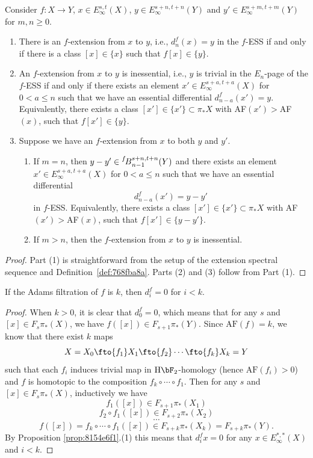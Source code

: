 \documentclass{amsart}
\numberwithin{equation}{section}
\newcommand{\AF}{\mathrm{AF}}
\newcommand{\BESS}[1]{\prescript{#1\!}{}{B}}
\newcommand{\HF}{\mathrm{H}\bF_2}
\begin{document}
\begin{proposition}\label{prop:8154e6f1}
Consider $f: X\to Y$, $x\in E_\infty^{s,t}(X)$, $y\in E_\infty^{s+n,t+n}(Y)$ and $y'\in E_\infty^{s+m,t+m}(Y)$ for $m,n\ge 0$.
\begin{enumerate}
    \item There is an $f$-extension from $x$ to $y$, i.e., $d_n^{f}(x)=y$ in the $f$-ESS if and only if there is a class $[x]\in \{x\}$ such that $f[x]\in \{y\}$.
    \item An $f$-extension from $x$ to $y$ is inessential, i.e., $y$ is trivial in the $E_n$-page of the $f$-ESS if and only if there exists an element $x'\in E_\infty^{s+a,t+a}(X)$ for $0<a\le n$ such that we have an essential differential $d_{n-a}^{f}(x')=y$. Equivalently, there exists a class $[x'] \in \{x'\} \subset \pi_*X$ with AF$(x')>$AF$(x)$, such that $f[x'] \in \{y\}$.
    
    \item Suppose we have an $f$-extension from $x$ to both $y$ and $y'$.
    \begin{enumerate}
        \item If $m=n$, then $y-y'\in \BESS{f}^{s+n,t+n}_{n-1}(Y)$ and there exists an element $x'\in E_\infty^{s+a,t+a}(X)$ for $0<a\le n$ such that we have an essential differential 
        $$d_{n-a}^{f}(x') = y-y'$$
        in $f$-ESS. Equivalently, there exists a class $[x'] \in \{x'\} \subset \pi_*X$ with AF$(x')>$AF$(x)$, such that $f[x'] \in \{y-y'\}$. 
        \item If $m>n$, then the $f$-extension from $x$ to $y$ is inessential.
     \end{enumerate}
\end{enumerate}
\end{proposition}

\begin{proof}
    Part (1) is straightforward from the setup of the extension spectral sequence and Definition~\ref{def:768fba8a}. Parts (2) and (3) follow from Part (1).
\end{proof}

\begin{corollary}
    If the Adams filtration of $f$ is $k$, then
    $d^f_i=0$ for $i<k$.
\end{corollary}

\begin{proof}
    When $k>0$, it is clear that $d^f_0=0$, which means that for any $s$ and $[x]\in F_s\pi_*(X)$, we have $f([x])\in F_{s+1}\pi_*(Y)$. Since $\AF(f)=k$, we know that there exist $k$ maps
    $$X=X_0\fto{f_1}X_1\fto{f_2}\cdots\fto{f_k}X_k=Y$$
    such that each $f_i$ induces trivial map in $\HF$-homology (hence $\AF(f_i)>0$) and $f$ is homotopic to the composition $f_k\circ \cdots\circ f_1.$
    Then for any $s$ and $[x]\in F_s\pi_*(X)$, inductively we have
    $$f_1([x])\in F_{s+1}\pi_*(X_1)$$
    $$f_2\circ f_1([x])\in F_{s+2}\pi_*(X_2)$$
    $$\cdots$$
    $$f([x])=f_k\circ\cdots\circ f_1([x])\in F_{s+k}\pi_*(X_k)=F_{s+k}\pi_*(Y).$$
    By Proposition \ref{prop:8154e6f1}.(1) this means that $d_i^fx=0$ for any $x\in E_\infty^{*,*}(X)$ and $i<k$.
\end{proof}
\end{document}

